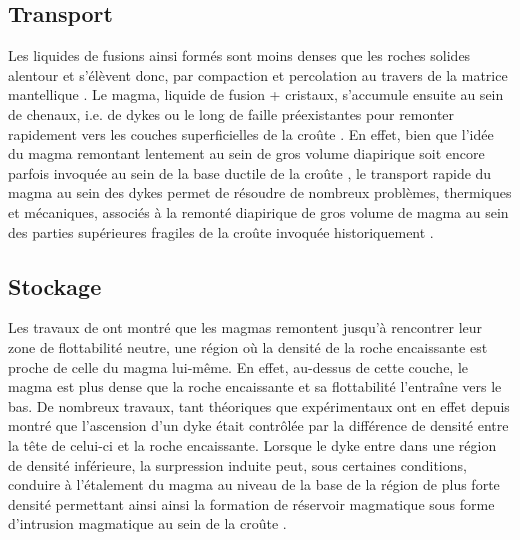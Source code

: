 \subsection{Transport}
\label{sec:transport}

Les liquides de fusions ainsi formés  sont moins denses que les roches
solides alentour et  s'élèvent donc, par compaction  et percolation au
travers          de           la          matrice          mantellique
\citep{McKenzy:1984bo,McKenzie:1985jq}. Le magma,  liquide de fusion +
cristaux, s'accumule ensuite au sein de  chenaux, i.e.  de dykes ou le
long  de  faille  préexistantes  pour remonter  rapidement  vers  les
couches          superficielles          de         la          croûte
\citep{Lister:1991ut,Clemens:1992kr,Petford:1993bk,Rubin:1995upa}.  En
effet, bien  que l'idée du magma  remontant lentement au sein  de gros
volume  diapirique soit  encore parfois  invoquée  au sein  de la  base
ductile  de  la   croûte  \citep{Weinberg:1994jg,Weinberg:1996vb},  le
transport rapide  du magma  au sein  des dykes  permet de  résoudre de
nombreux problèmes,  thermiques et  mécaniques, associés à  la remonté
diapirique de  gros volume  de magma au  sein des  parties supérieures
fragiles de la croûte invoquée historiquement \citep{Miller:1999km}.

\subsection{Stockage}
\label{sec:stockage}

Les  travaux  de  \citet{Walker:1989jq}  ont  montré  que  les  magmas
remontent  jusqu'à rencontrer  leur zone  de flottabilité  neutre, une
région où  la densité de la  roche encaissante est proche  de celle du
magma lui-même. En effet, au-dessus de cette couche, le magma est plus
dense que la  roche encaissante et sa flottabilité  l'entraîne vers le
bas.        De      nombreux       travaux,      tant       théoriques
\citep{Lister:1991ut,Petford:1993bk,Rubin:1995upa}  que  expérimentaux
\citep{Taisne:2009kj,Taisne:2011do}  ont en  effet  depuis montré  que
l'ascension d'un  dyke était  contrôlée par  la différence  de densité
entre la  tête de celui-ci  et la  roche encaissante. Lorsque  le dyke
entre dans  une région de  densité inférieure, la  surpression induite
peut, sous  certaines conditions, conduire  à l'étalement du  magma au
niveau de la base de la  région de plus forte densité permettant ainsi
ainsi  la formation  de  réservoir magmatique  sous forme  d'intrusion
magmatique au sein de la croûte \citep{Taisne:2011do}.

